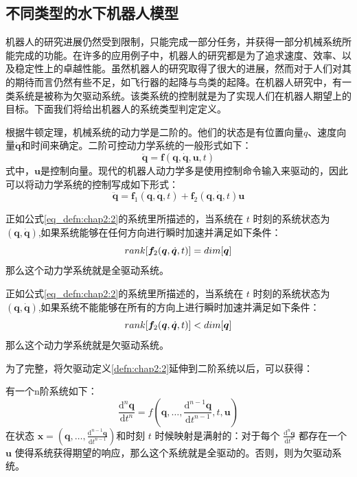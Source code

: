 \subsection{不同类型的水下机器人模型 }

机器人的研究进展仍然受到限制，只能完成一部分任务，并获得一部分机械系统所能完成的功能。在许多的应用例子中，机器人的研究都是为了追求速度、效率、以及稳定性上的卓越性能。虽然机器人的研究取得了很大的进展，然而对于人们对其的期待而言仍然有些不足，如飞行器的起降与鸟类的起降\cite{russdrakebook}。在机器人研究中，有一类系统是被称为欠驱动系统。该类系统的控制就是为了实现人们在机器人期望上的目标。下面我们将给出机器人的系统类型判定定义。

根据牛顿定理，机械系统的动力学是二阶的。他们的状态是有位置向量$q$、速度向量$\dot {\bm{q}}$和时间来确定。二阶可控动力学系统的一般形式如下：
\begin{equation}
\label{eq_defn:chap2:1}
\ddot{\bm{q}}= \bm{f}(\bm{q},\bm{\dot{q}},\bm{u},t)
\end{equation}
式中，$\bm{u}$是控制向量。现代的机器人动力学多是使用控制命令输入来驱动的，因此可以将动力学系统的控制写成如下形式：
\begin{equation}
\label{eq_defn:chap2:2}
\ddot{\bm{q}}= \bm{f}_1(\bm{q},\bm{\dot{q}},t)+
\bm{f}_2(\bm{q},\bm{\dot{q}},t)\bm{u}
\end{equation}

\begin{defn}[全驱动定义]
\label{defn:chap2:1}
正如公式\ref{eq_defn:chap2:2}的系统里所描述的，当系统在 $t$ 时刻的系统状态为 $(\bm{q},\bm{\dot q})$,如果系统能够在任何方向进行瞬时加速并满足如下条件：
\begin{equation}
\label{eq:defn_1}
\centering
{rank}[\bm{f}_2(\bm{q},{\dot{\bm{q}}},t)]=dim[\bm{q}]
\end{equation}
那么这个动力学系统就是全驱动系统。
\end{defn}

\begin{defn}[欠驱动定义]
\label{defn:chap2:2}
正如公式\ref{eq_defn:chap2:2}的系统里所描述的，当系统在 $t$ 时刻的系统状态为 $(\bm{q},\bm{\dot q})$,如果系统不能能够在所有的方向上进行瞬时加速并满足如下条件：
\begin{equation}
\label{eq:defn_2}
\centering
{rank}[\bm{f}_2(\bm{q},{\dot{\bm{q}}},t)]<dim[\bm{q}]
\end{equation}
那么这个动力学系统就是欠驱动系统。
\end{defn}

为了完整，将欠驱动定义\ref{defn:chap2:2}延伸到二阶系统以后，可以获得：
\begin{defn}[欠驱动定义延伸]
\label{defn:chap2:3}
有一个n阶系统如下：
\begin{equation}
\label{eq:defn_3}
\frac{\mathrm{d}^n {\bm{q}}}{\mathrm{d} t^n}=
f(\bm{q},\ldots,\frac{\mathrm{d}^{n-1} {\bm{q}}}{\mathrm{d} t^{n-1} },t,\bm{u})
\end{equation}
在状态 $\bm{x} = (\bm{q},\ldots,\frac{\mathrm{d}^{n-1} {\bm{q}}}{\mathrm{d} t^{n-1} })$和时刻 $t$ 时候映射是满射的：对于每个 $\frac{\mathrm{d}^n {\bm{q}}}{\mathrm{d} t^n}$ 都存在一个 $\bm{u}$ 使得系统获得期望的响应，那么这个系统就是全驱动的。否则，则为欠驱动系统。
\end{defn}

